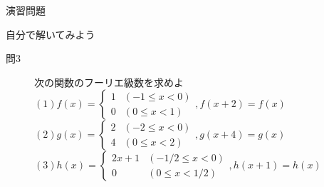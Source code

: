 \documentclass[professionalfonts]{beamer}
\begin{document}
\begin{frame}{演習問題}
  \begin{exampleblock}{自分で解いてみよう}
  \begin{description}
    \item[問3] 次の関数のフーリエ級数を求めよ
    $(1) f(x) = \begin{cases} 1 & (-1 \leq x < 0) \\ 0 & (0 \leq x < 1) \end{cases},  f(x+2) = f(x)$\\
    $(2) g(x) = \begin{cases} 2 & (-2 \leq x < 0) \\ 4 & (0 \leq x < 2) \end{cases},  g(x+4) = g(x)$\\
    $(3) h(x) = \begin{cases} 2x+1 & (-1/2 \leq x < 0) \\ 0 & (0 \leq x < 1/2) \end{cases},  h(x+1) = h(x)$\\
  \end{description}
  \end{exampleblock}
\end{frame}
\end{document}
